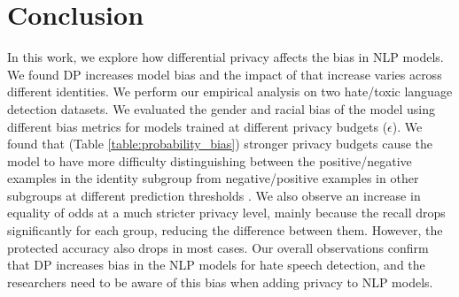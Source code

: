\documentclass[11pt]{article} %
\begin{document}
\section{Conclusion \label{sec:conclusion}}
In this work, we explore how differential privacy affects the bias in NLP models. We found DP increases model bias and the impact of that increase varies across different identities. We perform our empirical analysis on two hate/toxic language detection datasets. We evaluated the gender and racial bias of the model using different bias metrics for models trained at different privacy budgets ($\epsilon$). We found that (Table \ref{table:probability_bias}) stronger privacy budgets cause the model to have more difficulty distinguishing between the positive/negative examples in the identity subgroup from negative/positive examples in other subgroups at different prediction thresholds \cite{borkan2019nuanced}. We also observe an increase in equality of odds at a much stricter privacy level, mainly because the recall drops significantly for each group, reducing the difference between them. However, the protected accuracy also drops in most cases. Our overall observations confirm that DP increases bias in the NLP models for hate speech detection, and the researchers need to be aware of this bias when adding privacy to NLP models.
\end{document}
